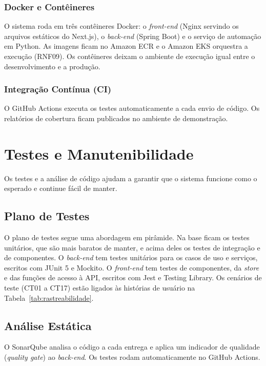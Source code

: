 \subsubsection{Docker e Contêineres}

O sistema roda em três contêineres Docker: o \textit{front-end} (Nginx servindo os arquivos estáticos do Next.js), o \textit{back-end} (Spring Boot) e o serviço de automação em Python. As imagens ficam no Amazon ECR e o Amazon EKS orquestra a execução (RNF09). Os contêineres deixam o ambiente de execução igual entre o desenvolvimento e a produção.

\subsubsection{Integração Contínua (CI)}

O GitHub Actions executa os testes automaticamente a cada envio de código. Os relatórios de cobertura ficam publicados no ambiente de demonstração.

\section{Testes e Manutenibilidade}

Os testes e a análise de código ajudam a garantir que o sistema funcione como o esperado e continue fácil de manter.

\subsection{Plano de Testes}

O plano de testes segue uma abordagem em pirâmide. Na base ficam os testes unitários, que são mais baratos de manter, e acima deles os testes de integração e de componentes. O \textit{back-end} tem testes unitários para os casos de uso e serviços, escritos com JUnit 5 e Mockito. O \textit{front-end} tem testes de componentes, da \textit{store} e das funções de acesso à API, escritos com Jest e Testing Library. Os cenários de teste (CT01 a CT17) estão ligados às histórias de usuário na Tabela~\ref{tab:rastreabilidade}.

\subsection{Análise Estática}

O SonarQube analisa o código a cada entrega e aplica um indicador de qualidade (\textit{quality gate}) ao \textit{back-end}. Os testes rodam automaticamente no GitHub Actions.

